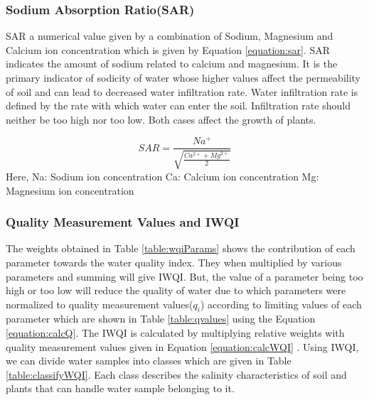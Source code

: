 \subsubsection{Sodium Absorption Ratio(SAR)}
\label{subsubsection:sar}
SAR a numerical value given by a combination of Sodium, Magnesium and Calcium ion concentration which is given by Equation \ref{equation:sar}. SAR indicates the amount of sodium related to calcium and magnesium. It is the primary indicator of sodicity of water whose higher values affect the permeability of soil and can lead to decreased water infiltration rate\cite{book:waterQualityAgri}. Water infiltration rate is defined by the rate with which water can enter the soil. Infiltration rate should neither be too high nor too low. Both cases affect the growth of plants. 

\begin{equation}
\label{equation:sar}
    SAR = \frac{Na^+}{\sqrt{\frac{Ca^{2+} + Mg^{2+}}{2}}} 
\end{equation}
Here, \newline
Na: Sodium ion concentration \newline
Ca: Calcium ion concentration \newline
Mg: Magnesium ion concentration \newline

\subsubsection{Quality Measurement Values and IWQI}
\label{subsubsection:calcIWQI}
The weights obtained in Table \ref{table:wqiParams} shows the contribution of each parameter towards the water quality index. They when multiplied by various parameters and summing will give IWQI. But, the value of a parameter being too high or too low will reduce the quality of water due to which parameters were normalized to quality measurement values($q_i$) according to limiting values of each parameter which are shown in Table \ref{table:qvalues} using the Equation \ref{equation:calcQ}. The IWQI is calculated by multiplying relative weights with quality measurement values given in Equation \ref{equation:calcWQI} . Using IWQI, we can divide water samples into classes which are given in Table \ref{table:classifyWQI}. Each class describes the salinity characteristics of soil and plants that can handle water sample belonging to it. 

